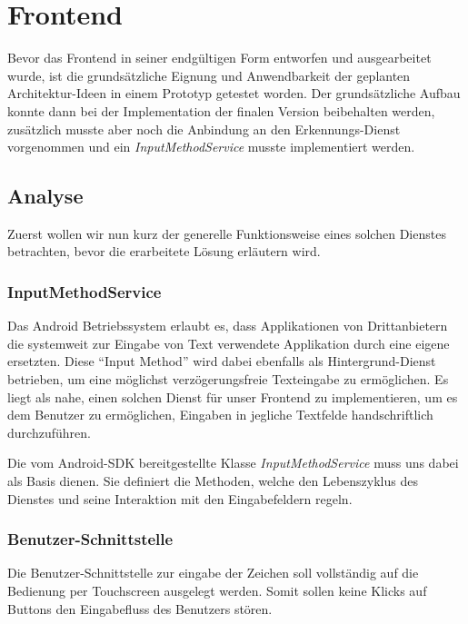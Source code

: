 \chapter{Frontend}

Bevor das Frontend in seiner endgültigen Form entworfen und ausgearbeitet wurde, ist die grundsätzliche Eignung und Anwendbarkeit der geplanten Architektur-Ideen in einem Prototyp getestet worden. Der grundsätzliche Aufbau konnte dann bei der Implementation der finalen Version beibehalten werden, zusätzlich musste aber noch die Anbindung an den Erkennungs-Dienst vorgenommen und ein \emph{InputMethodService} musste implementiert werden.

\section{Analyse}

Zuerst wollen wir nun kurz der generelle Funktionsweise eines solchen Dienstes betrachten, bevor die erarbeitete Lösung erläutern wird.

\subsection{InputMethodService}

Das Android Betriebssystem erlaubt es, dass Applikationen von Drittanbietern die systemweit zur Eingabe von Text verwendete Applikation durch eine eigene ersetzten. Diese ``Input Method'' wird dabei ebenfalls als Hintergrund-Dienst betrieben, um eine möglichst verzögerungsfreie Texteingabe zu ermöglichen. Es liegt als nahe, einen solchen Dienst für unser Frontend zu implementieren, um es dem Benutzer zu ermöglichen, Eingaben in jegliche Textfelde handschriftlich durchzuführen. \cite{adg_ime}

Die vom Android-SDK bereitgestellte Klasse \emph{InputMethodService} muss uns dabei als Basis dienen. Sie definiert die Methoden, welche den Lebenszyklus des Dienstes und seine Interaktion mit den Eingabefeldern regeln.

\subsection{Benutzer-Schnittstelle}

Die Benutzer-Schnittstelle zur eingabe der Zeichen soll vollständig auf die Bedienung per Touchscreen ausgelegt werden. Somit sollen keine Klicks auf Buttons den Eingabefluss des Benutzers stören.

